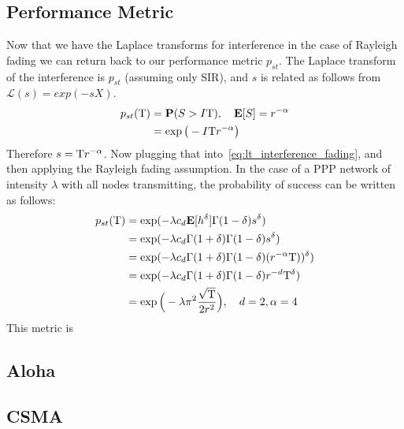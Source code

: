 \subsection{Performance Metric}
%
Now that we have the Laplace transforms for interference in the case of Rayleigh fading we can return back to our performance metric $p_{st}$.  The Laplace transform of the interference is $p_{st}$ (assuming only SIR), and $s$ is related as follows from $\mathcal{L}(s)=exp(-sX)$.
%
\begin{equation}
  \begin{split}
    p_{st}(\mathrm{T}) &= \textbf{P} (S>I \mathrm{T}), \quad \textbf{E}[S] = r^{-\alpha} \\
    &= \exp \big( -I \mathrm{T} r^{-\alpha} \big)
  \end{split}
\end{equation}
%
Therefore $s = \mathrm{T} r^{-\alpha}$.  Now plugging that into~\eqref{eq:lt_interference_fading}, and then applying the Rayleigh fading assumption.  In the case of a PPP network of intensity $\lambda$ with all nodes transmitting, the probability of success can be written as follows:
%
\begin{equation}
  \begin{split}
        p_{st}(\mathrm{T}) &= \exp(-\lambda c_d \textbf{E}[h^\delta] \Gamma(1-\delta)s^\delta) \\
        &= \exp(-\lambda c_d \Gamma(1+\delta) \Gamma(1-\delta)s^\delta) \\
        &= \exp(-\lambda c_d \Gamma(1+\delta) \Gamma(1-\delta)(r^{-\alpha} \mathrm{T}))^\delta) \\
        &= \exp(-\lambda c_d \Gamma(1+\delta) \Gamma(1-\delta) r^{-d} \mathrm{T}^\delta) \\
    &= \exp \Big( -\lambda \pi^2 \frac{\sqrt{\mathrm{T}}}{2 r^2}  \Big),\quad d=2,\alpha=4
  \end{split}
\end{equation}
%
This metric is\par
%
\subsection{Aloha}
%
%
\subsection{CSMA}
%

%
